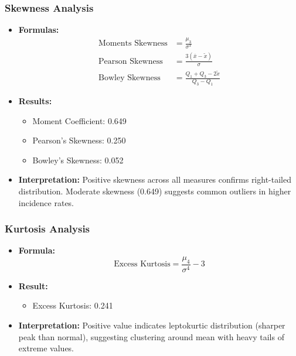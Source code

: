 \begin{frame}
    \frametitle{Skewness Analysis}
    \begin{itemize}
        \item \textbf{Formulas:}
        \[
        \begin{aligned}
        \text{Moments Skewness} &= \frac{\mu_3}{\sigma^3} \\
        \text{Pearson Skewness} &= \frac{3(\bar{x} - \tilde{x})}{\sigma} \\
        \text{Bowley Skewness} &= \frac{Q_1 + Q_3 - 2\tilde{x}}{Q_3 - Q_1}
        \end{aligned}
        \]
        
        \item \textbf{Results:}
        \begin{itemize}
            \item Moment Coefficient: 0.649
            \item Pearson's Skewness: 0.250
            \item Bowley's Skewness: 0.052
        \end{itemize}
        
        \item \textbf{Interpretation:} Positive skewness across all measures confirms right-tailed distribution. Moderate skewness (0.649) suggests common outliers in higher incidence rates.
    \end{itemize}
\end{frame}

\begin{frame}
    \frametitle{Kurtosis Analysis}
    \begin{itemize}
        \item \textbf{Formula:}
        \[
        \text{Excess Kurtosis} = \frac{\mu_4}{\sigma^4} - 3
        \]
        
        \item \textbf{Result:}
        \begin{itemize}
            \item Excess Kurtosis: 0.241
        \end{itemize}
        
        \item \textbf{Interpretation:} Positive value indicates leptokurtic distribution (sharper peak than normal), suggesting clustering around mean with heavy tails of extreme values.
    \end{itemize}
\end{frame}

